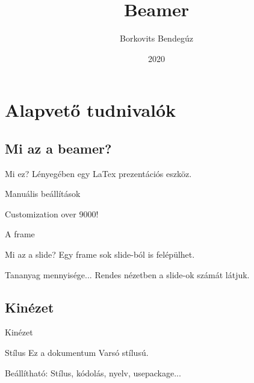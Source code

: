 \documentclass[11pt]{beamer}
\author{Borkovits Bendegúz}
\title{Beamer}
\institute{ELTE}
\date{2020}
\begin{document}


\begin{frame}
\titlepage
\end{frame}

\section{Alapvető tudnivalók}

\subsection{Mi az a beamer?}

\begin{frame}{Mi ez?}
Lényegében egy \alert{LaTex} prezentációs eszköz.

Manuális beállítások

Customization over 9000!
\end{frame}

\begin{frame}{A frame}
\begin{block}{Mi az a slide?}
Egy frame sok  \pause
slide-ból is felépülhet. \pause
\end{block}
\begin{alertblock}{Tananyag mennyisége...}
Rendes nézetben a \alert{slide}-ok számát látjuk.
\end{alertblock}

\end{frame}

\subsection{Kinézet}

\begin{frame}{Kinézet}
\begin{block}{Stílus}
Ez a dokumentum Varsó stílusú.
\end{block}

\begin{block}{Beállítható:}
Stílus, kódolás, nyelv, usepackage...
\end{block}
\end{frame}
\end{document}
